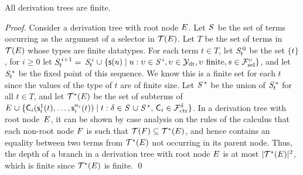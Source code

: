 \begin{theorem}[Termination]%
\label{thm:t}%
\afterDot
All derivation trees are finite.
\end{theorem}
\begin{proof}
Consider a derivation tree with root node $E$.
Let $\SSS$ be the set of terms occurring as the argument of a selector in $\mathcal{T}(E)$.
Let $T$ be the set of terms in $\mathcal{T}(E)$ whose types are finite datatypes.
For each term $t \in T$,
let $\mathit{S}^{\,0}_t$ be the set $\{ t \}$,
for $i \geq 0$ let $\mathit{S}^{\,i+1}_t =$ $\mathit{S}^{\,i}_t \mathrel\cup \{ \textsf{s}( u ) \mid u : \upsilon \in \mathit{S}^{\,i}, \upsilon \in \mathcal{Y}_{\mathrm{dt}}, \upsilon \text{ finite}, s \in \mathcal{F}_{\mathrm{sel}}^{\upsilon}  \}$,
and let $\mathit{S}^{\,\ast}_t$ be the fixed point of this sequence.
We know this is a finite set for each $t$ since the values of the type of $t$ are of finite size.
Let $\mathit{S}^{\,\ast}$ be the union of $\mathit{S}^{\,\ast}_t$ for all $t \in T$,
and let $\mathcal{T}^\ast(E)$ be the set of subterms of $\Ec \mathrel\cup \{ \const C_i( \const s^1_i( t ), \ldots, \const s^{n_i}_i( t ) ) \mid t : \delta \in \SSS \mathrel\cup \SSSS \ast,\, \const C_i \in \Ctr^\delta \}$.
In a derivation tree with root node~$E$,
it can be shown by case analysis on the rules of the calculus that each non-root node $F$ is such that
$\mathcal{T}(F) \subseteq \mathcal{T}^\ast(E)$, and hence contains an equality between two terms from $\mathcal{T}^\ast(E)$ not occurring in its parent node.
Thus, the depth of a branch in a derivation tree with root node $E$ is at most $\left| \smash{\mathcal{T}^\ast(E)}\vphantom{X} \right|{\!}^2$,
which is finite since $\mathcal{T}^\ast(E)$ is finite.
\qed
\end{proof}

